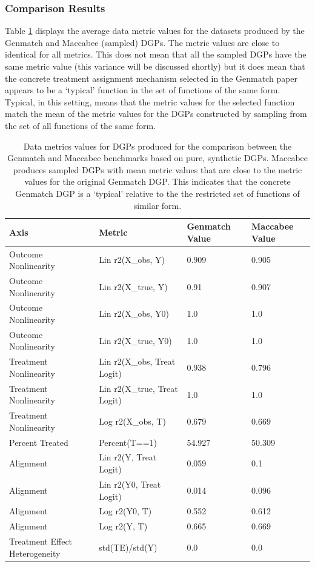 \documentclass[../main.tex]{subfiles}
\begin{document}
\subsubsection{Comparison Results}

Table \ref{tbl:pure-synth-data-metrics-1} displays the average data metric values for the datasets produced by the Genmatch and Maccabee (sampled) DGPs. The metric values are close to identical for all metrics. This does not mean that all the sampled DGPs have the same metric value (this variance will be discussed shortly) but it does mean that the concrete treatment assignment mechanism selected in the Genmatch paper appears to be a `typical' function in the set of functions of the same form. Typical, in this setting, means that the metric values for the selected function match the mean of the metric values for the DGPs constructed by sampling from the set of all functions of the same form.


\begin{table}[ht!]
\centering
    \begin{tabular}{|l|l|m{2cm}|m{2cm}|}
    \hline
    \rowcolor[HTML]{EFEFEF} 
    Axis & Metric & Genmatch Value & Maccabee Value \\ \hline
    Outcome Nonlinearity & Lin r2(X\_obs, Y) & 0.909 & 0.905 \\ \hline
    Outcome Nonlinearity & Lin r2(X\_true, Y) & 0.91 & 0.907 \\ \hline
    Outcome Nonlinearity & Lin r2(X\_obs, Y0) & 1.0 & 1.0 \\ \hline
    Outcome Nonlinearity & Lin r2(X\_true, Y0) & 1.0 & 1.0 \\ \hline
    Treatment Nonlinearity & Lin r2(X\_obs, Treat Logit) & 0.938 & 0.796 \\ \hline
    Treatment Nonlinearity & Lin r2(X\_true, Treat Logit) & 1.0 & 1.0 \\ \hline
    Treatment Nonlinearity & Log r2(X\_obs, T) & 0.679 & 0.669 \\ \hline
    Percent Treated & Percent(T==1) & 54.927 & 50.309 \\ \hline
    Alignment & Lin r2(Y, Treat Logit) & 0.059 & 0.1 \\ \hline
    Alignment & Lin r2(Y0, Treat Logit) & 0.014 & 0.096 \\ \hline
    Alignment & Log r2(Y0, T) & 0.552 & 0.612 \\ \hline
    Alignment & Log r2(Y, T) & 0.665 & 0.669 \\ \hline
    Treatment Effect Heterogeneity & std(TE)/std(Y) & 0.0 & 0.0 \\ \hline
    \end{tabular}
    \caption{Data metrics values for DGPs produced for the comparison between the Genmatch and Maccabee benchmarks based on pure, synthetic DGPs. Maccabee produces sampled DGPs with mean metric values that are close to the metric values for the original Genmatch DGP. This indicates that the concrete Genmatch DGP is a `typical' relative to the the restricted set of functions of similar form.}
    \label{tbl:pure-synth-data-metrics-1}
\end{table}
\FloatBarrier
\end{document}
